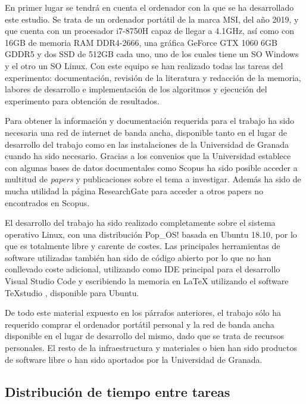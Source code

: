 En primer lugar se tendrá en cuenta el ordenador con la que se ha desarrollado este estudio. Se trata de un ordenador portátil de la marca MSI, del año 2019, y que cuenta con un procesador i7-8750H capaz de llegar a 4.1GHz, así como con 16GB de memoria RAM DDR4-2666, una gráfica GeForce GTX 1060 6GB GDDR5 y dos SSD de 512GB cada uno, uno de los cuales tiene un SO Windows y el otro un SO Linux. Con este equipo se han realizado todas las tareas del experimento: documentación, revisión de la literatura y redacción de la memoria, labores de desarrollo e implementación de los algoritmos y ejecución del experimento para obtención de resultados.

Para obtener la información y documentación requerida para el trabajo ha sido necesaria una red de internet de banda ancha, disponible tanto en el lugar de desarrollo del trabajo como en las instalaciones de la Universidad de Granada cuando ha sido necesario. Gracias a los convenios que la Universidad establece con algunas bases de datos documentales como Scopus \cite{scopus-website} ha sido posible acceder a multitud de \textit{papers} y publicaciones sobre el tema a investigar. Además ha sido de mucha utilidad la página ResearchGate \cite{research-gate-website} para acceder a otros papers no encontrados en Scopus.

El desarrollo del trabajo ha sido realizado completamente sobre el sistema operativo Linux, con una distribución Pop\_OS! \cite{pop-os} basada en Ubuntu 18.10, por lo que es totalmente libre y carente de costes. Las principales herramientas de software utilizadas también han sido de código abierto por lo que no han conllevado coste adicional, utilizando como IDE principal para el desarrollo Visual Studio Code \cite{vscode-github} y escribiendo la memoria en LaTeX utilizando el software TeXstudio \cite{texstudio}, disponible para Ubuntu.

De todo este material expuesto en los párrafos anteriores, el trabajo sólo ha requerido comprar el ordenador portátil personal y la red de banda ancha disponible en el lugar de desarrollo del mismo, dado que se trata de recursos personales. El resto de la infraestructura y materiales o bien han sido productos de software libre o han sido aportados por la Universidad de Granada.

\subsection{Distribución de tiempo entre tareas}


